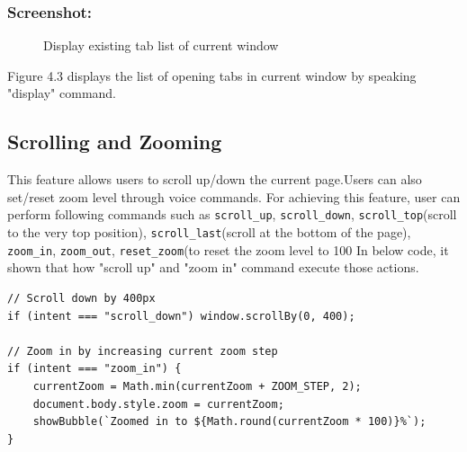 \subsubsection*{Screenshot:}
\begin{figure}[htbp] 
    \centering
    \caption{ Display existing tab list of current window}
    \label{fig:display_tabs}
\end{figure}

Figure 4.3 displays the list of opening tabs in current window by speaking "display" command.

\subsection{Scrolling and Zooming}
This feature allows users to scroll up/down the current page.Users can also set/reset zoom level through voice commands. For achieving this feature, user can perform following commands such as \texttt{scroll\_up}, \texttt{scroll\_down}, \texttt{scroll\_top}(scroll to the very top position), \texttt{scroll\_last}(scroll at the bottom of the page), \texttt{zoom\_in}, \texttt{zoom\_out}, \texttt{reset\_zoom}(to reset the zoom level to 100%
In below code, it shown that how "scroll up" and "zoom in" command execute those actions.

\begin{verbatim}
// Scroll down by 400px
if (intent === "scroll_down") window.scrollBy(0, 400);

// Zoom in by increasing current zoom step
if (intent === "zoom_in") {
    currentZoom = Math.min(currentZoom + ZOOM_STEP, 2);
    document.body.style.zoom = currentZoom;
    showBubble(`Zoomed in to ${Math.round(currentZoom * 100)}%`);
}
\end{verbatim}

\vspace{1in} 

